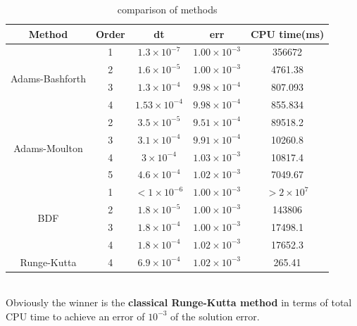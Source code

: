 \documentclass[a4paper,twocolumn]{article}
\theoremstyle{definition}
\begin{document}
\begin{table}[!htp]
	\centering
	\begin{tabular}{|c|c|c|c|c|}
		\hline
		Method & Order & dt & err & CPU time(ms) \\
		\hline	
		\multirow{4}{*}{Adams-Bashforth} & 1 & $1.3\times 10^{-7}$ & $1.00\times 10^{-3}$ 
		& 356672\\
		\cline{2-5}		
		& 2 &$1.6\times 10^{-5}$&$ 1.00\times 10^{-3}$ & 4761.38\\	
		\cline{2-5}		
		& 3 &$1.3\times 10^{-4}$&$ 9.98\times 10^{-4}$ & 807.093 \\	
		\cline{2-5} 
		& 4 &$1.53\times 10^{-4}$&$ 9.98\times 10^{-4}$ & 855.834 \\
		\hline
		\multirow{4}{*}{Adams-Moulton} & 2 & $3.5\times 10^{-5}$&$ 9.51\times 10^{-4}$ 
		&  89518.2 \\
		\cline{2-5}		
		& 3 &$3.1\times 10^{-4}$& $ 9.91\times 10^{-4}$& 10260.8\\	
		\cline{2-5}		
		& 4 &$3\times 10^{-4}$ &$ 1.03\times 10^{-3}$& 10817.4\\	
		\cline{2-5} 
		& 5 &$4.6\times 10^{-4}$ &$ 1.02\times 10^{-3}$ & 7049.67\\
		\hline
		\multirow{4}{*}{BDF} & 1 & $< 1\times 10^{-6}$&$1.00\times 10^{-3}$ 
		& $>2\times 10^{7}$  \\
		\cline{2-5}		
		& 2 &$1.8\times 10^{-5}$& $ 1.00\times 10^{-3}$& 143806\\	
		\cline{2-5}		
		& 3 &$1.8\times 10^{-4}$ &$ 1.00\times 10^{-3}$ & 17498.1\\	
		\cline{2-5} 
		& 4 &$1.8\times 10^{-4}$ &$ 1.02\times 10^{-3}$ & 17652.3\\
		\hline
		Runge-Kutta & 4 & $6.9\times 10^{-4}$ &$ 1.02\times 10^{-3}$ & 265.41\\
		\hline
	\end{tabular}
	\caption{comparison of methods}
	\label{tab:test4}
\end{table}\\
Obviously the winner is the \textbf{classical Runge-Kutta method} in terms of total CPU time
to achieve an error of $10^{-3}$ of the solution error.
\end{document}
